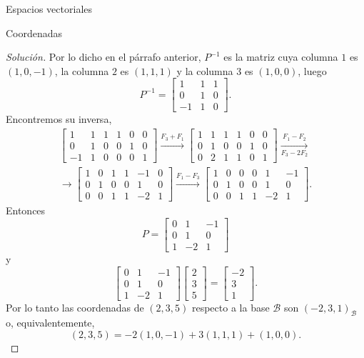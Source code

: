 \documentclass[a4paper,12pt,twoside,spanish,reqno]{amsbook}
\theoremstyle{definition}
\theoremstyle{remark}
\begin{document}
\begin{chapter}{Espacios vectoriales}
\begin{section}{Coordenadas}
\begin{proof}[Solución]
    Por lo dicho en el párrafo anterior, $P^{-1}$  es la matriz cuya  columna $1$ es $(1,0,-1)$,  la columna $2$ es $(1,1,1)$ y la columna $3$ es $(1,0,0)$, luego 
    $$
    P^{-1} = \begin{bmatrix} 1&1&1\\0&1&0\\-1&1&0	\end{bmatrix}.
    $$ 
    Encontremos su inversa,
        \begin{multline*} 
    \left[\begin{array}{rrr|rrr}	1&1&1&1&0&0\\ 0&1&0&0&1&0\\ -1&1&0&0&0&1 \end{array}\right]
    \stackrel{F_3+ F_1}{\longrightarrow}
    \left[\begin{array}{rrr|rrr}	1&1&1&1&0&0\\ 0&1&0&0&1&0\\ 0&2&1&1&0&1 \end{array}\right]
    \underset{F_3-2F_2}{\stackrel{F_1 - F_2}{\longrightarrow}}\\
    \longrightarrow 
    \left[\begin{array}{rrr|rrr}	1&0&1&1&-1&0\\ 0&1&0&0&1&0\\ 0&0&1&1&-2&1 \end{array}\right]
    \stackrel{F_1 - F_3}{\longrightarrow}
    \left[\begin{array}{rrr|rrr}	1&0&0&0&1&-1\\ 0&1&0&0&1&0\\ 0&0&1&1&-2&1 \end{array}\right]
    .
    \end{multline*}
    Entonces 
    $$
    P = \left[\begin{array}{rrr}	0&1&-1\\ 0&1&0\\ 1&-2&1 \end{array}\right]
    $$
    y 
    $$
    \left[\begin{array}{rrr}	0&1&-1\\ 0&1&0\\ 1&-2&1 \end{array}\right]
    \left[\begin{array}{r} 2\\3\\5 \end{array}\right] = 
    \left[\begin{array}{r} -2\\3\\1 \end{array}\right].
    $$
    Por  lo tanto las coordenadas de   $(2,3,5)$ respecto a la base  $\mathcal{B}$ son $(-2,3,1)_{\mathcal B}$ o,  equivalentemente, 
    $$
    (2,3,5) = -2(1,0,-1)+3(1,1,1)+(1,0,0).
    $$
    
      
\end{proof}
    
    \end{section}

    \end{chapter}
    
\end{document}

